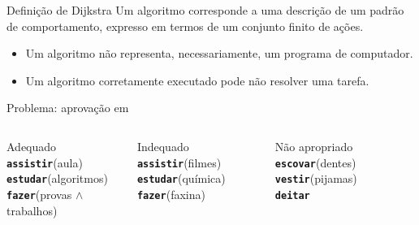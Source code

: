 \newcommand{\function}[1]{\texttt{\textbf{#1}}}%
\begin{frame}[fragile,label=main]

	\begin{block}{Definição de Dijkstra}
		Um algoritmo corresponde a uma descrição de um padrão de comportamento, expresso em termos de um conjunto finito de ações.
	\end{block}
	\vfill\pause	
	\begin{itemize}
		\item Um algoritmo não representa, necessariamente, um programa de computador.
			\pause
		\item Um algoritmo corretamente executado pode não resolver uma tarefa.%
	\end{itemize}
	\vfill
	Problema: aprovação em \insertshortsubtitle\pause
	\begin{columns}[T]\small
			\begin{exampleblock}{Adequado}
				\function{assistir}(aula)\\
				\function{estudar}(algoritmos)\\
				\function{fazer}(provas $\land$ trabalhos)
			\end{exampleblock}
			\pause
			\begin{block}{Indequado}
				\function{assistir}(filmes)\\
				\function{estudar}(química)\\
				\function{fazer}(faxina)
			\end{block}
			\pause
			\begin{alertblock}{Não apropriado}
				\function{escovar}(dentes)\\
				\function{vestir}(pijamas)\\
				\function{deitar}
			\end{alertblock}
	\end{columns}
\end{frame}